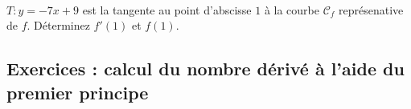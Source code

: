 \documentclass[main.tex]{subfiles}
\begin{document}
 \begin{exercise}\hfill \\
$T\colon y=-7x+9$ est la tangente au point d'abscisse $1$ à la courbe $\mathscr{C}_f$ représenative de $f$. Déterminez $f'(1)$ et $f(1)$.
 \end{exercise} 
%	 
\newpage 
{}  
\pagestyle{scrheadings} %
\onehalfspacing
\subsection{Exercices : calcul du nombre dérivé à l'aide du premier principe}
\end{document}
